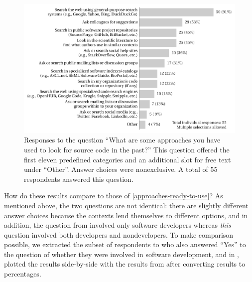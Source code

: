 \documentclass{casicswhitepaper}
\newcommand{\totalSearchers}{55\xspace}
\begin{document}
\begin{figure}[thb]
  \centering
  \includegraphics{files/plots/how-find-src.pdf}
  \vspace*{-4ex}
  \caption{Responses to the question ``What are some approaches you have used to look for source code in the past?''  This question offered the first eleven predefined categories and an additional slot for free text under ``Other''.  Answer choices were nonexclusive.  A total of \totalSearchers respondents answered this question.}
  \label{how-find-src}
\end{figure}


How do these results compare to those of \ref{approaches-ready-to-use}?  As mentioned above, the two questions are not identical: there are slightly different answer choices because the contexts lend themselves to different options, and in addition, the question from  involved only software developers whereas \emph{this} question involved both developers and nondevelopers.  To make comparison possible, we extracted the subset of respondents to  who also answered ``Yes'' to the question of whether they were involved in software development, and in , plotted the results side-by-side with the results from  after converting results to percentages.
\end{document}
